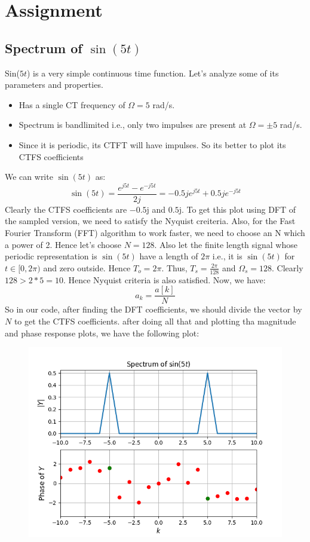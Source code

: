 \documentclass[12pt, a4paper]{article}
\begin{document}
\section{Assignment}
\subsection{Spectrum of $\sin(5t)$}
Sin($5t$) is a very simple continuous time function. Let's analyze some of its parameters and properties.
\begin{itemize}
    \item Has a single CT frequency of $\Omega = 5$ rad/s.
    \item Spectrum is bandlimited i.e., only two impulses are present at $\Omega = \pm 5$ rad/s.
    \item Since it is periodic, its CTFT will have impulses. So its better to plot its CTFS coefficients 
\end{itemize}
We can write $\sin(5t)$ as:
\begin{equation*}
    \sin(5t) = \frac{e^{j5t}-e^{-j5t}}{2j} = -0.5je^{j5t} + 0.5je^{-j5t}
\end{equation*}
Clearly the CTFS coefficients are $-0.5$j and $0.5$j. To get this plot using DFT of the sampled version, we need to satisfy the Nyquist creiteria. Also, for the Fast Fourier Transform (FFT) algorithm to work faster, we need to choose an N which a power of 2. Hence let's choose $N=128$. Also let the finite length signal whose periodic representation is $\sin(5t)$ have a length of $2\pi$ i.e., it is $\sin(5t)$ for $t \in [0,2\pi)$ and zero outside. Hence $T_{o} = 2\pi$. Thus, $T_{s}=\frac{2\pi}{128}$ and $\Omega_{s}=128$. Clearly $128>2*5=10$. Hence Nyquist criteria is also satisfied. Now, we have:
\begin{equation*}
    a_{k} = \frac{a[k]}{N}
\end{equation*}
So in our code, after finding the DFT coefficients, we should divide the vector by $N$ to get the CTFS coefficients. after doing all that and plotting tha magnitude and phase response plots, we have the following plot:
\vspace*{-0.5cm}
\begin{figure}[H]
    \centering
    \includegraphics[scale = 0.8]{Figure_1.png}
    \label{fig:sample}
\end{figure}
\end{document}
